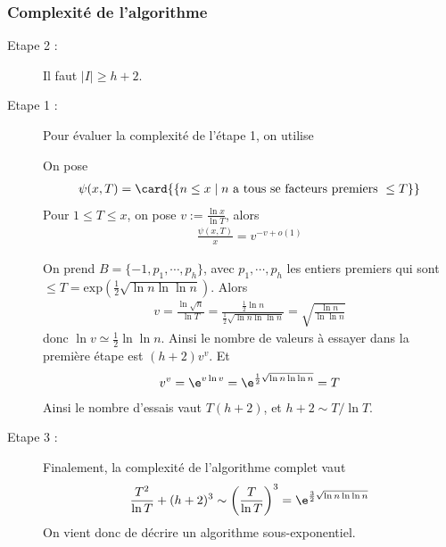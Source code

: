             \subsubsection{Complexité de l'algorithme}
                \begin{description}
                    \item[Etape 2 :]  Il faut $|I| \geq h + 2$.
                    \item[Etape 1 :] Pour évaluer la complexité de l'étape 1, on utilise
                    \begin{theo}
                        On pose
                        \begin{align*}
                            \psi(x, T) = \card{\{n \leq x \mid n \text{ a tous se facteurs premiers } \leq T\}}
                        \end{align*}
                        Pour $1 \leq T \leq x$, on pose $v := \frac{\ln x}{\ln T}$, alors
                        \begin{align*}
                            \frac{\psi(x, T)}x = v^{-v + o(1)}
                        \end{align*}
                    \end{theo}
                    On prend $B = \{-1, p_1, \cdots, p_h\}$, avec $p_1, \cdots, p_h$ les entiers premiers qui sont $\leq T = \mathrm{exp}\left(\frac12 \sqrt{\ln n \ln \ln n}\right)$. Alors 
                    \begin{align*}
                        v = \frac{\ln \sqrt{n}}{\ln T} = \frac{\frac12 \ln n}{\frac12 \sqrt{\ln n \ln \ln n}} = \sqrt{\frac{\ln n}{\ln \ln n}}
                    \end{align*}
                    donc $\ln v \simeq \frac12 \ln \ln n$. Ainsi le nombre de valeurs à essayer dans la première étape est $(h  + 2)v^v$. Et
                    \begin{align*}
                        v^v = \e^{v \ln v} = \e^{\frac12 \sqrt{\ln n \ln \ln n}} = T
                    \end{align*}
                    Ainsi le nombre d'essais vaut $T(h + 2)$, et $h + 2 \sim T/\ln T$.
                    \item[Etape 3 :] Finalement, la complexité de l'algorithme complet  vaut 
                    \begin{align*}
                        \frac{T^2}{\ln T} + (h + 2)^3 \sim \left( \frac{T}{\ln T} \right)^3 = \e^{\frac32 \sqrt{\ln n \ln \ln n}}
                    \end{align*}
                    On vient donc de décrire un algorithme sous-exponentiel.
                \end{description}
